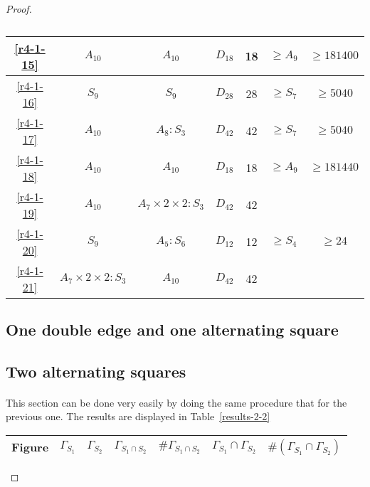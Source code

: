 \begin{proof}
\begin{table}
\begin{tabular}{|c|c|c|c|c|c|c|}
    \ref{r4-1-15}& $A_{10}$ & $A_{10}$ & $D_{18}$ & 18 & $\ge A_9$ & $\ge 181400$ \\ \hline
    \ref{r4-1-16}& $S_9$ & $S_9$ & $D_{28}$ & 28 & $\ge S_7$ & $\ge 5040$ \\ \hline
    \ref{r4-1-17}& $A_{10}$ & $A_8 : S_3$ & $D_{42}$ & 42 & $\ge S_7$ & $\ge 5040$ \\ \hline
    \ref{r4-1-18}& $A_{10}$ & $A_{10}$ & $D_{18}$ & 18 & $\ge A_9$ & $\ge 181440$ \\ \hline
    \ref{r4-1-19}& $A_{10}$ & $A_7 \times 2 \times 2 : S_3$ & $D_{42}$ & 42 & & \\ \hline
    \ref{r4-1-20}& $S_9$ & $A_5 : S_6$ & $D_{12}$ & 12 & $\ge S_4$ & $\ge 24$ \\ \hline
    \ref{r4-1-21}& $A_7 \times 2 \times 2 : S_{3}$ & $A_{10}$ & $D_{42}$ & 42 & & \\ \hline

  \end{tabular}
  \caption{}
  \label{results-2-1}
\end{table}

\subsection{One double edge and one alternating square}

\subsection{Two alternating squares}
  \paragraph{}
  This section can be done very easily by doing the same procedure that for the previous one. The results are displayed in Table~\ref{results-2-2}

  \begin{table}
    \centering
    \begin{tabular}{|c|c|c|c|c|c|c|}
      \hline
      Figure & $\Gamma_{S_1}$ & $\Gamma_{S_2}$ & $\Gamma_{S_1 \cap S_2}$ & $\#\Gamma_{S_1 \cap S_2}$ & $\Gamma_{S_1} \cap \Gamma_{S_2}$ & $\#(\Gamma_{S_1} \cap \Gamma_{S_2})$ \\ \hline


\end{tabular}
\end{table}
\end{proof}
